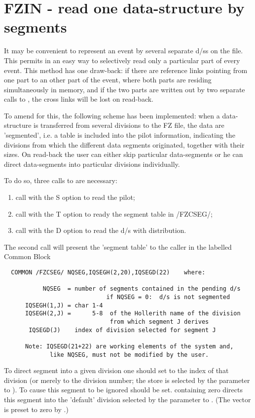\section{FZIN - read one data-structure by segments}

It may be convenient to represent an event by several separate
d/ss on the file.
This permits in an easy way to selectively read only a particular
part of every event.
This method has one draw-back:
if there are reference links pointing from one part to an other part
of the event, where both parts are residing simultaneously in
memory, and if the two parts are written out by two separate calls to
, the cross links will be lost on read-back.

To amend for this, the following scheme has been implemented:
when a data-structure is transferred from several divisions to the
FZ file, the data are 'segmented', i.e. a table is included
into the pilot information, indicating the divisions from which
the different data segments originated, together with their sizes.
On read-back the user can either skip particular data-segments or
he can direct data-segments into particular divisions individually.

To do so, three calls to  are necessary:
\begin{enumerate}
  \item call with the S option to read the pilot;
  \item call with the T option to ready the segment table in /FZCSEG/;
  \item call with the D option to read the d/s with distribution.
\end{enumerate}

The second call will present the 'segment table' to the caller
in the labelled Common Block
\begin{verbatim}
  COMMON /FZCSEG/ NQSEG,IQSEGH(2,20),IQSEGD(22)    where:

           NQSEG  = number of segments contained in the pending d/s
                             if NQSEG = 0:  d/s is not segmented
      IQSEGH(1,J) = char 1-4
      IQSEGH(2,J) =      5-8  of the Hollerith name of the division
                              from which segment J derives
       IQSEGD(J)    index of division selected for segment J

      Note: IQSEGD(21+22) are working elements of the system and,
             like NQSEG, must not be modified by the user.
\end{verbatim}
To direct segment  into a given division one should set
 to the index of that division
(or merely to the division number;
the store is selected by the parameter  to ).
To cause this segment to be ignored  should be set.
 containing zero directs this segment into the
'default' division selected by the parameter  to .
(The vector  is preset to zero by .)

